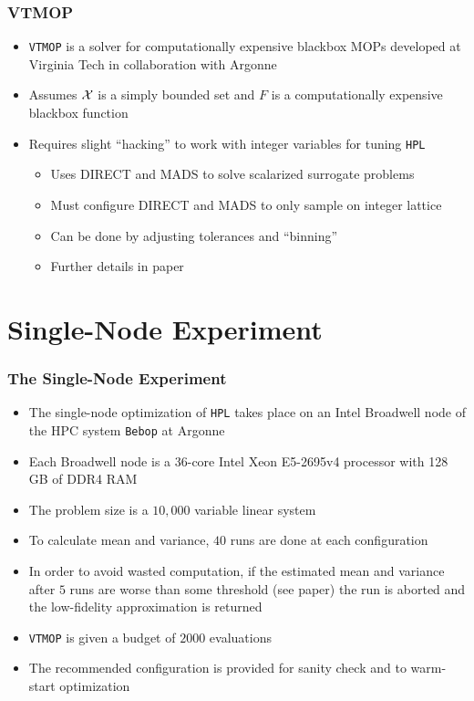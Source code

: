 \documentclass[aspectratio=169]{beamer}
\begin{document}
\begin{frame}\frametitle{VTMOP}
	\begin{itemize}
		\item \texttt{VTMOP} is a solver for computationally expensive
			blackbox MOPs developed at Virginia Tech in
			collaboration with Argonne
		\item Assumes ${\cal X}$ is a simply bounded set and $F$
			is a computationally expensive blackbox function
		\item Requires slight ``hacking'' to work with integer
			variables for tuning \texttt{HPL}
			\begin{itemize}
				\item Uses DIRECT and MADS to solve scalarized
					surrogate problems
				\item Must configure DIRECT and MADS to only
					sample on integer lattice
				\item Can be done by adjusting tolerances
					and ``binning''
				\item Further details in paper
			\end{itemize}
	\end{itemize}
\end{frame}

\section{Single-Node Experiment}

\begin{frame}\frametitle{The Single-Node Experiment}
	\begin{itemize}
		\item The single-node optimization of \texttt{HPL} takes
			place on an Intel Broadwell node of the HPC
			system \texttt{Bebop} at Argonne
		\item Each Broadwell node is a 36-core Intel Xeon E5-2695v4
			processor with 128 GB of DDR4 RAM
		\item The problem size is a $10,000$ variable linear system
		\item To calculate mean and variance, $40$ runs are done
			at each configuration
		\item In order to avoid wasted computation, if the estimated
			mean and variance after $5$ runs are worse than some
			threshold (see paper) the run is aborted and the
			low-fidelity approximation is returned
		\item \texttt{VTMOP} is given a budget of $2000$ evaluations
		\item The recommended configuration is provided for sanity
			check and to warm-start optimization
	\end{itemize}
\end{frame}
\end{document}
